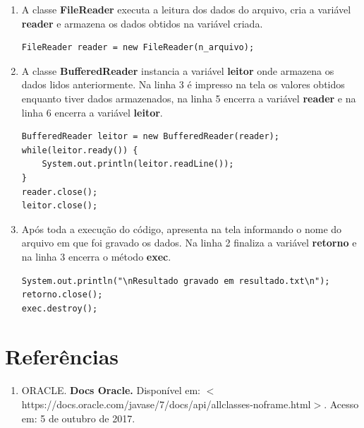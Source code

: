 \documentclass[14pt, a4paper]{article}
\begin{document}
\begin{enumerate}
\begin{lstlisting}
arquivo = new FileWriter(new File(n_arquivo));
arquivo.write("Resultado da operacao: ");
arquivo.write(resultado);
arquivo.close();
\end{lstlisting}                    

\item A classe \textbf{FileReader} executa a leitura dos dados do arquivo, cria a variável \textbf{reader} e armazena os dados obtidos na variável criada.

\begin{lstlisting}                    
FileReader reader = new FileReader(n_arquivo);
\end{lstlisting}                                        

\item A classe \textbf{BufferedReader} instancia a variável \textbf{leitor} onde armazena os dados lidos anteriormente. Na linha 3 é impresso na tela os valores obtidos enquanto tiver dados armazenados, na linha 5 encerra a variável \textbf{reader} e na linha 6 encerra a variável \textbf{leitor}.

\begin{lstlisting}
BufferedReader leitor = new BufferedReader(reader);
while(leitor.ready()) {
	System.out.println(leitor.readLine());
}
reader.close();
leitor.close();
\end{lstlisting}                                        

\item Após toda a execução do código, apresenta na tela informando o nome do arquivo em que foi gravado os dados. Na linha 2 finaliza a variável \textbf{retorno} e na linha 3 encerra o método \textbf{exec}.

\begin{lstlisting}                    
System.out.println("\nResultado gravado em resultado.txt\n");
retorno.close();
exec.destroy();
\end{lstlisting}                    

\end{enumerate}

\section{Referências}
\begin{enumerate}

\item ORACLE. \textbf{Docs Oracle.} Disponível em: $<$https://docs.oracle.com/javase/7/docs/api/allclasses-noframe.html$>$. Acesso em: 5 de outubro de 2017.

\end{enumerate}
\end{document}
